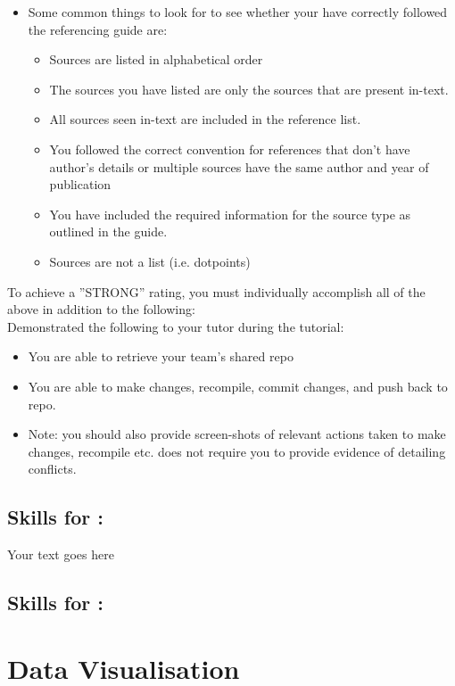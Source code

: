 \documentclass[a4paper, 11pt]{report}
\begin{document}
\begin{itemize}
\begin{itemize}
	\item Some common things to look for to see whether your have correctly followed the referencing guide are:
		\begin{itemize}
		\item Sources are listed in alphabetical order
		\item The sources you have listed are only the sources that are present in-text.
		\item All sources seen in-text are included in the reference list.
		\item You followed the correct convention for references that don’t have author’s details or multiple sources have the same author and year of publication
		\item You have included the required information for the source type as outlined in the guide.
		\item Sources are not a list (i.e. dotpoints)
		\end{itemize}
	\end{itemize}
\end{itemize}

To achieve a ''STRONG'' rating, you must individually accomplish all of the above in addition to the following:\\
Demonstrated the following to your tutor during the tutorial:
\begin{itemize}
\item You are able to retrieve your team’s shared repo
\item You are able to make changes, recompile, commit changes, and push back to repo.
\item Note: you should also provide screen-shots of relevant actions taken to make changes, recompile etc. does not require you to provide evidence of detailing conflicts.
\end{itemize}



\subsection{Skills for \majA: \studA}

Your text goes here

\subsection{Skills for \majB: \studB}

\section*{Data Visualisation}
\end{document}
